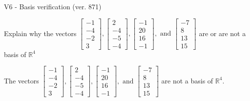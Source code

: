 \begin{exercise}
  \begin{exerciseTitle}V6 - Basis verification (ver. 871)\end{exerciseTitle}
  \begin{exerciseStatement}
    Explain why the vectors \(\left[\begin{array}{r}
-1 \\
-4 \\
-2 \\
3
\end{array}\right] , \left[\begin{array}{r}
2 \\
-4 \\
-5 \\
-4
\end{array}\right] , \left[\begin{array}{r}
-1 \\
20 \\
16 \\
-1
\end{array}\right] , \text{ and } \left[\begin{array}{r}
-7 \\
8 \\
13 \\
15
\end{array}\right]\) are or are not a basis of \(\mathbb{R}^4\)	


  \end{exerciseStatement}
  \begin{exerciseAnswer}
   The vectors \(\left[\begin{array}{r}
-1 \\
-4 \\
-2 \\
3
\end{array}\right] , \left[\begin{array}{r}
2 \\
-4 \\
-5 \\
-4
\end{array}\right] , \left[\begin{array}{r}
-1 \\
20 \\
16 \\
-1
\end{array}\right] , \text{ and } \left[\begin{array}{r}
-7 \\
8 \\
13 \\
15
\end{array}\right]\) 
  	 are not  a basis of \(\mathbb{R}^4\).
  


  \end{exerciseAnswer}
\end{exercise}